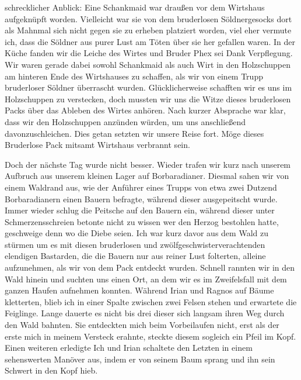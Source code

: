 schrecklicher Anblick: Eine Schankmaid war draußen vor dem Wirtshaus aufgeknüpft worden. Vielleicht war sie von dem bruderlosen Söldnergesocks dort als Mahnmal sich nicht gegen sie zu erheben platziert worden, viel eher vermute ich, dass die Söldner aus purer Lust am Töten über sie her gefallen waren. In der Küche fanden wir die Leiche des Wirtes und Bruder Phex sei Dank Verpflegung. Wir waren gerade dabei sowohl Schankmaid als auch Wirt in den Holzschuppen am hinteren Ende des Wirtshauses zu schaffen, als wir von einem Trupp bruderloser Söldner überrascht wurden. Glücklicherweise schafften wir es uns im Holzschuppen zu verstecken, doch mussten wir uns die Witze dieses bruderlosen Packs über das Ableben des Wirtes anhören. Nach kurzer Absprache war klar, dass wir den Holzschuppen anzünden würden, um uns anschließend davonzuschleichen. Dies getan setzten wir unsere Reise fort. Möge dieses Bruderlose Pack mitsamt Wirtshaus verbrannt sein.

Doch der nächste Tag wurde nicht besser. Wieder trafen wir kurz nach unserem Aufbruch aus unserem kleinen Lager auf Borbaradianer. Diesmal sahen wir von einem Waldrand aus, wie der Anführer eines Trupps von etwa zwei Dutzend Borbaradianern einen Bauern befragte, während dieser ausgepeitscht wurde. Immer wieder schlug die Peitsche auf den Bauern ein, während dieser unter Schmerzensschreien betonte nicht zu wissen wer den Herzog bestohlen hatte, geschweige denn wo die Diebe seien. Ich war kurz davor aus dem Wald zu stürmen um es mit diesen bruderlosen und zwölfgeschwisterverachtenden elendigen Bastarden, die die Bauern nur aus reiner Lust folterten, alleine aufzunehmen, als wir von dem Pack entdeckt wurden. Schnell rannten wir in den Wald hinein und suchten uns einen Ort, an dem wir es im Zweifelsfall mit dem ganzen Haufen aufnehmen konnten. Während Irian und Ragnos auf Bäume kletterten, blieb ich in einer Spalte zwischen zwei Felsen stehen und erwartete die Feiglinge. Lange dauerte es nicht bis drei dieser sich langsam ihren Weg durch den Wald bahnten. Sie entdeckten mich beim Vorbeilaufen nicht, erst als der erste mich in meinem Versteck erahnte, steckte diesem sogleich ein Pfeil im Kopf. Einen weiteren erledigte Ich und Irian schaltete den Letzten in einem sehenswerten Manöver aus, indem er von seinem Baum sprang und ihn sein Schwert in den Kopf hieb.

